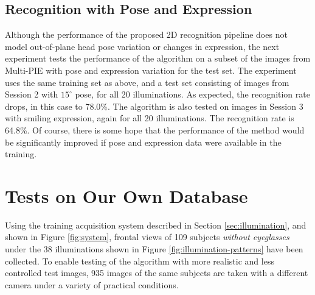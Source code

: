 \subsection{Recognition with Pose and Expression} Although the performance of
the proposed 2D recognition pipeline does not model out-of-plane head pose
variation or changes in expression, the next experiment tests the performance
of the algorithm on a subset of the images from Multi-PIE with pose and
expression variation for the test set.  The experiment uses the same training
set as above, and a test set consisting of images from Session 2 with
$15^\circ$ pose, for all 20 illuminations. As expected, the recognition rate
drops, in this case to 78.0\%. The algorithm is also tested on images in
Session 3 with smiling expression, again for all 20 illuminations. The
recognition rate is 64.8\%.  Of course, there is some hope that the
performance of the method would be significantly improved if pose and expression
data were available in the training.

\section{Tests on Our Own Database}\label{sec:own-data} Using the training
acquisition system described in Section \ref{sec:illumination}, and shown in
Figure \ref{fig:system}, frontal views of 109 subjects {\em without eyeglasses}
under the 38 illuminations shown in Figure \ref{fig:illumination-patterns} have
been collected. To enable testing of the algorithm with more realistic and less
controlled test images, 935 images of the same subjects are taken with a
different camera under a variety of practical conditions.

